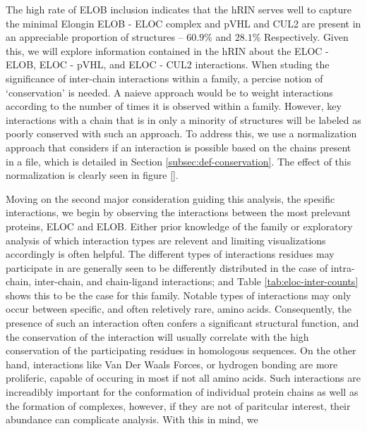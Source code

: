 The high rate of ELOB inclusion indicates that the hRIN serves well to capture the minimal Elongin ELOB - ELOC complex and pVHL and CUL2 are present in an appreciable proportion of structures -- $60.9\%$ and $28.1\%$ Respectively. Given this, we will explore information contained in the hRIN about the ELOC - ELOB, ELOC - pVHL, and ELOC - CUL2 interactions. When studing the significance of inter-chain interactions within a family, a percise notion of `conservation' is needed. A naieve approach would be to weight interactions according to the number of times it is observed within a family. However, key interactions with a chain that is in only a minority of structures will be labeled as poorly conserved with such an approach. To address this, we use a normalization approach that considers if an interaction is possible based on the chains present in a file, which is detailed in Section \ref{subsec:def-conservation}. The effect of this normalization is clearly seen in figure \ref{}. 

Moving on the second major consideration guiding this analysis, the spesific interactions, we begin by observing the interactions between the most prelevant proteins, ELOC and ELOB. Either prior knowledge of the family or exploratory analysis of which interaction types are relevent and limiting visualizations accordingly is often helpful. The different types of interactions residues may participate in are generally seen to be differently distributed in the case of intra-chain, inter-chain, and chain-ligand interactions; and Table \ref{tab:eloc-inter-counts} shows this to be the case for this family. Notable types of interactions may only occur between specific, and often reletively rare, amino acids. Consequently, the presence of such an interaction often confers a significant structural function, and the conservation of the interaction will usually correlate with the high conservation of the participating residues in homologous sequences. %
On the other hand, interactions like Van Der Waals Forces, or hydrogen bonding are more proliferic, capable of occuring in most if not all amino acids. Such interactions are increadibly important for the conformation of individual protein chains as well as the formation of complexes, however, if they are not of paritcular interest, their abundance can complicate analysis. 
With this in mind, we 


